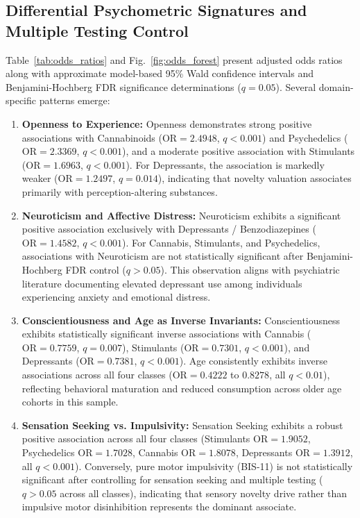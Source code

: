 \documentclass[conference]{IEEEtran}
\begin{document}
\subsection{Differential Psychometric Signatures and Multiple Testing Control}
Table~\ref{tab:odds_ratios} and Fig.~\ref{fig:odds_forest} present adjusted odds ratios along with approximate model-based 95\% Wald confidence intervals and Benjamini-Hochberg FDR significance determinations ($q = 0.05$). Several domain-specific patterns emerge:
\begin{enumerate}
    \item \textbf{Openness to Experience:} Openness demonstrates strong positive associations with Cannabinoids ($\text{OR} = 2.4948$, $q < 0.001$) and Psychedelics ($\text{OR} = 2.3369$, $q < 0.001$), and a moderate positive association with Stimulants ($\text{OR} = 1.6963$, $q < 0.001$). For Depressants, the association is markedly weaker ($\text{OR} = 1.2497$, $q = 0.014$), indicating that novelty valuation associates primarily with perception-altering substances.
    \item \textbf{Neuroticism and Affective Distress:} Neuroticism exhibits a significant positive association exclusively with Depressants / Benzodiazepines ($\text{OR} = 1.4582$, $q < 0.001$). For Cannabis, Stimulants, and Psychedelics, associations with Neuroticism are not statistically significant after Benjamini-Hochberg FDR control ($q > 0.05$). This observation aligns with psychiatric literature documenting elevated depressant use among individuals experiencing anxiety and emotional distress.
    \item \textbf{Conscientiousness and Age as Inverse Invariants:} Conscientiousness exhibits statistically significant inverse associations with Cannabis ($\text{OR} = 0.7759$, $q = 0.007$), Stimulants ($\text{OR} = 0.7301$, $q < 0.001$), and Depressants ($\text{OR} = 0.7381$, $q < 0.001$). Age consistently exhibits inverse associations across all four classes ($\text{OR} = 0.4222$ to $0.8278$, all $q < 0.01$), reflecting behavioral maturation and reduced consumption across older age cohorts in this sample.
    \item \textbf{Sensation Seeking vs. Impulsivity:} Sensation Seeking exhibits a robust positive association across all four classes (Stimulants $\text{OR} = 1.9052$, Psychedelics $\text{OR} = 1.7028$, Cannabis $\text{OR} = 1.8078$, Depressants $\text{OR} = 1.3912$, all $q < 0.001$). Conversely, pure motor impulsivity (BIS-11) is not statistically significant after controlling for sensation seeking and multiple testing ($q > 0.05$ across all classes), indicating that sensory novelty drive rather than impulsive motor disinhibition represents the dominant associate.
\end{enumerate}
\end{document}
